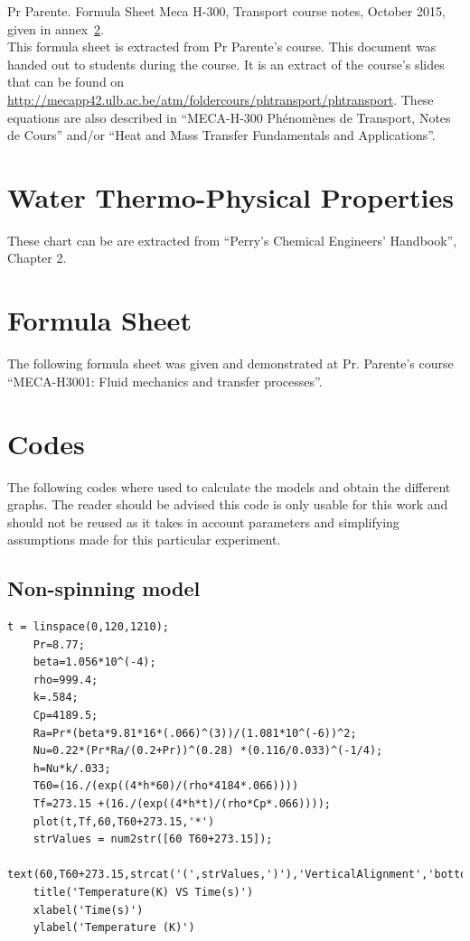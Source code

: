 \documentclass{report}
\begin{document}
	\vspace{11pt}
	
	Pr Parente. Formula Sheet Meca H-300, Transport course notes, October 2015, given in annex~\ref{FORMU}.\\
	This formula sheet is extracted from Pr Parente's course. This document was handed out to students during the course. It is an extract of the course's slides that can be found on \url{http://mecapp42.ulb.ac.be/atm/foldercours/phtransport/phtransport}. These equations are also described in ``MECA-H-300 Phénomènes de Transport, Notes de Cours''\cite{Buchlin} and/or ``Heat and Mass Transfer Fundamentals and Applications''\cite{HaMT}.
	
	
	\chapter{Water Thermo-Physical Properties}\label{WTPP}
	
	These chart can be are extracted from ``Perry’s	Chemical Engineers’ Handbook'', Chapter 2\cite{properties}.
	
	
	
	\chapter{Formula Sheet}\label{FORMU}
	
	The following formula sheet was given and demonstrated at Pr. Parente's course ``MECA-H3001: Fluid mechanics and transfer processes''.
	
	
	
	\chapter{Codes}
	
	The following codes where used to calculate the models and obtain the different graphs. The reader should be advised this code is only usable for this work and should not be reused as it takes in account parameters and simplifying assumptions made for this particular experiment.
	
	\section{Non-spinning model}\label{codeNS}
	
	\begin{lstlisting}[style=Matlab-editor]
	t = linspace(0,120,1210);
	Pr=8.77;
	beta=1.056*10^(-4);
	rho=999.4;
	k=.584;
	Cp=4189.5;
	Ra=Pr*(beta*9.81*16*(.066)^(3))/(1.081*10^(-6))^2;
	Nu=0.22*(Pr*Ra/(0.2+Pr))^(0.28) *(0.116/0.033)^(-1/4);
	h=Nu*k/.033;
	T60=(16./(exp((4*h*60)/(rho*4184*.066))))
	Tf=273.15 +(16./(exp((4*h*t)/(rho*Cp*.066))));
	plot(t,Tf,60,T60+273.15,'*')
	strValues = num2str([60 T60+273.15]);
	text(60,T60+273.15,strcat('(',strValues,')'),'VerticalAlignment','bottom');
	title('Temperature(K) VS Time(s)')
	xlabel('Time(s)')
	ylabel('Temperature (K)')
	\end{lstlisting}
	
\end{document}
